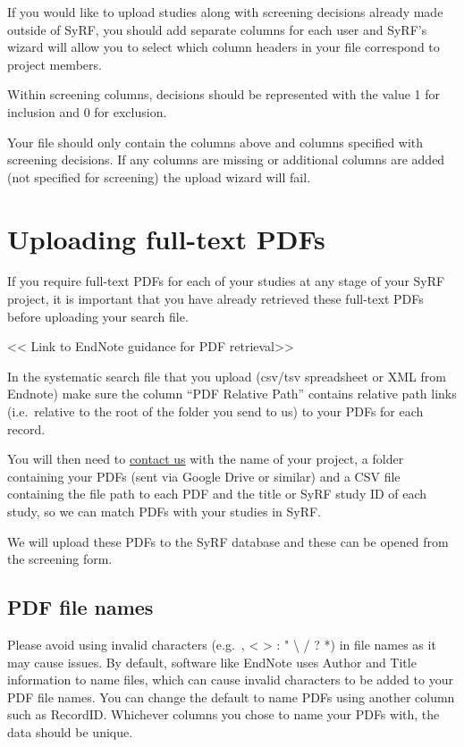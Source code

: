 \documentclass[
]{book}
\begin{document}
If you would like to upload studies along with screening decisions already made outside of SyRF, you should add separate columns for each user and SyRF's wizard will allow you to select which column headers in your file correspond to project members.

Within screening columns, decisions should be represented with the value 1 for inclusion and 0 for exclusion.

Your file should only contain the columns above and columns specified with screening decisions. If any columns are missing or additional columns are added (not specified for screening) the upload wizard will fail.

\hypertarget{uploading-full-text-pdfs}{%
\section{Uploading full-text PDFs}\label{uploading-full-text-pdfs}}

If you require full-text PDFs for each of your studies at any stage of your SyRF project, it is important that you have already retrieved these full-text PDFs before uploading your search file.

\textless{}\textless{} Link to EndNote guidance for PDF retrieval\textgreater{}\textgreater{}

In the systematic search file that you upload (csv/tsv spreadsheet or XML from Endnote) make sure the column ``PDF Relative Path'' contains relative path links (i.e.~relative to the root of the folder you send to us) to your PDFs for each record.

You will then need to \href{syrf.info@ed.ac.uk}{contact us} with the name of your project, a folder containing your PDFs (sent via Google Drive or similar) and a CSV file containing the file path to each PDF and the title or SyRF study ID of each study, so we can match PDFs with your studies in SyRF.

We will upload these PDFs to the SyRF database and these can be opened from the screening form.

\hypertarget{pdf-file-names}{%
\subsection{PDF file names}\label{pdf-file-names}}

Please avoid using invalid characters (e.g.~, \textless{} \textgreater{} : " \textbackslash{} / \textbar{} ? *) in file names as it may cause issues. By default, software like EndNote uses Author and Title information to name files, which can cause invalid characters to be added to your PDF file names. You can change the default to name PDFs using another column such as RecordID. Whichever columns you chose to name your PDFs with, the data should be unique.
\end{document}
